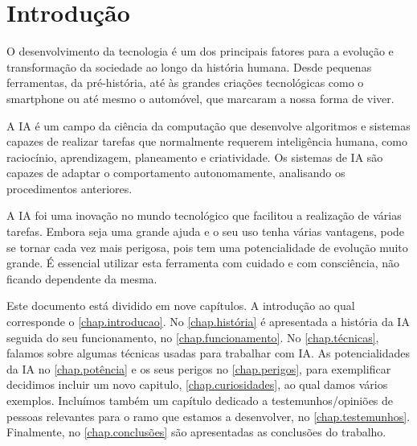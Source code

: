 \documentclass{report}
\begin{document}

\renewcommand{\contentsname}{Índice}
\tableofcontents
\listoffigures    %


\clearpage
{}

\chapter{Introdução}
\label{chap.introducao}
O desenvolvimento da tecnologia é um dos principais fatores para a evolução e transformação da sociedade ao longo da história humana. Desde pequenas ferramentas, da pré-história, até às grandes criações tecnológicas como o smartphone ou até mesmo o automóvel, que marcaram a nossa forma de viver. 
\vspace{5pt}

A \ac{IA} é um campo da ciência da computação que desenvolve algoritmos e sistemas capazes de realizar tarefas que normalmente requerem inteligência humana, como raciocínio, aprendizagem, planeamento e criatividade. Os sistemas de \ac{IA} são capazes de adaptar o comportamento autonomamente, analisando os procedimentos anteriores. 
\vspace{5pt}

A \ac{IA} foi uma inovação no mundo tecnológico que facilitou a realização de várias tarefas. Embora seja uma grande ajuda e o seu uso tenha várias vantagens, pode se tornar cada vez mais perigosa, pois tem uma potencialidade de evolução muito grande. É essencial utilizar esta ferramenta com cuidado e com consciência, não ficando dependente da mesma. 
\vspace{5pt}

Este documento está dividido em nove capítulos. A introdução ao qual corresponde o  \autoref{chap.introducao}. No \autoref{chap.história} é apresentada a história da \ac{IA} seguida do seu funcionamento, no \autoref{chap.funcionamento}. No \autoref{chap.técnicas}, falamos sobre algumas técnicas usadas para trabalhar com \ac{IA}. As potencialidades da \ac{IA} no \autoref{chap.potência} e os seus perigos no \autoref{chap.perigos}, para exemplificar decidimos incluir um novo capitulo, \autoref{chap.curiosidades}, ao qual damos vários exemplos. Incluímos também um capítulo dedicado a testemunhos/opiniões de pessoas relevantes para o ramo que estamos a desenvolver, no \autoref{chap.testemunhos}. Finalmente, no \autoref{chap.conclusões} são apresentadas as conclusões do trabalho.
\end{document}
